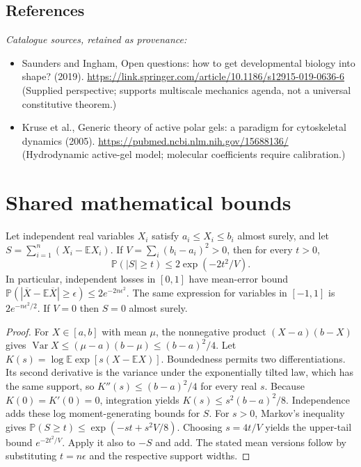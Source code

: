 \documentclass[11pt]{article}
\begin{document}
\subsection{References}
\noindent\emph{Catalogue sources, retained as provenance:}
\begin{itemize}
\item Saunders and Ingham, Open questions: how to get developmental biology into shape? (2019). \url{https://link.springer.com/article/10.1186/s12915-019-0636-6} (Supplied perspective; supports multiscale mechanics agenda, not a universal constitutive theorem.)
\item Kruse et al., Generic theory of active polar gels: a paradigm for cytoskeletal dynamics (2005). \url{https://pubmed.ncbi.nlm.nih.gov/15688136/} (Hydrodynamic active-gel model; molecular coefficients require calibration.)
\end{itemize}




\section{Shared mathematical bounds}\label{app:bounds}
\begin{lemma}\label{lem:bounded}
Let independent real variables $X_i$ satisfy $a_i\leq X_i\leq b_i$ almost surely,
and let $S=\sum_{i=1}^n(X_i-\mathbb{E} X_i)$. If
$V=\sum_i(b_i-a_i)^2>0$, then for every $t>0$,
\[
 \mathbb{P}(|S|\geq t)\leq 2\exp(-2t^2/V).
\]
In particular, independent losses in $[0,1]$ have mean-error bound
$\mathbb{P}(|\overline X-\mathbb{E}\overline X|\geq\epsilon)
\leq2e^{-2n\epsilon^2}$. The same expression for variables in $[-1,1]$
is $2e^{-n\epsilon^2/2}$. If $V=0$ then $S=0$ almost surely.
\end{lemma}
\begin{proof}
For $X\in[a,b]$ with mean $\mu$, the nonnegative product
$(X-a)(b-X)$ gives
$\operatorname{Var} X\leq(\mu-a)(b-\mu)\leq(b-a)^2/4$.
Let $K(s)=\log\mathbb{E}\exp[s(X-\mathbb{E} X)]$.
Boundedness permits two differentiations. Its second derivative is the variance
under the exponentially tilted law, which has the same support, so
$K''(s)\leq(b-a)^2/4$ for every real $s$.
Because $K(0)=K'(0)=0$, integration yields
$K(s)\leq s^2(b-a)^2/8$.
Independence adds these log moment-generating bounds for $S$.
For $s>0$, Markov's inequality gives
$\mathbb{P}(S\geq t)\leq\exp(-st+s^2V/8)$.
Choosing $s=4t/V$ yields the upper-tail bound $e^{-2t^2/V}$.
Apply it also to $-S$ and add. The stated mean versions follow by substituting
$t=n\epsilon$ and the respective support widths.
\end{proof}
\end{document}
